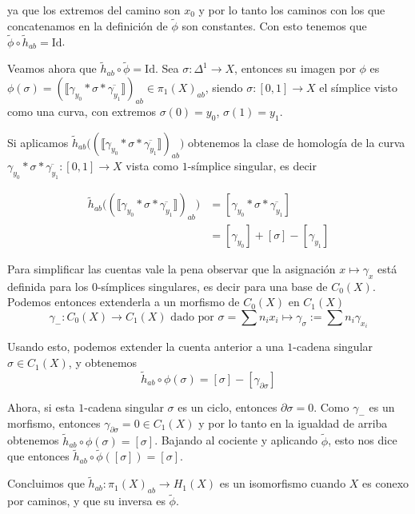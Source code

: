 ya que los extremos del camino son $x_0$ y por lo tanto los caminos con los que concatenamos en la definición de $\tilde{\phi}$ son constantes. Con esto tenemos que $\tilde{\phi}\circ\tilde{h}_{ab}= \text{Id}$.

Veamos ahora que $\tilde{h}_{ab}\circ\tilde{\phi}=\text{Id}$. Sea $\sigma:\Delta^1\to X$, entonces su imagen por $\phi$ es $\phi(\sigma)=\left(\llbracket\gamma_{y_0} *\sigma * \overline{\gamma_{y_1}}\rrbracket\right)_{ab}\in\pi_1(X)_{ab}$, siendo $\sigma:[0,1]\to X$ el símplice visto como una curva, con extremos $\sigma(0)=y_0$, $\sigma(1)=y_1$.

Si aplicamos $\tilde{h}_{ab}\big(\left(\llbracket\gamma_{y_0} *\sigma * \overline{\gamma_{y_1}}\rrbracket\right)_{ab}\big)$ obtenemos la clase de homología de la curva $\gamma_{y_0} *\sigma * \overline{\gamma_{y_1}}:[0,1]\to X$ vista como $1$-símplice singular, es decir

\begin{align*}
	\tilde{h}_{ab}\big(\left(\llbracket\gamma_{y_0} *\sigma * \overline{\gamma_{y_1}}\rrbracket\right)_{ab}\big)
	&=[\gamma_{y_0} *\sigma * \overline{\gamma_{y_1}}]\\
	&=[\gamma_{y_0}]+[\sigma]-[\gamma_{y_1}]
\end{align*}

Para simplificar las cuentas vale la pena observar que la asignación $x\mapsto \gamma_x$ está definida para los $0$-símplices singulares, es decir para una base de $C_0(X)$. Podemos entonces extenderla a un morfismo de $C_0(X)$ en $C_1(X)$ $$\gamma_{-}:C_0(X)\to C_1(X)\text{ dado por }\sigma=\sum n_i x_i\mapsto \gamma_\sigma := \sum n_i\gamma_{x_i}$$


Usando esto, podemos extender la cuenta anterior a una $1$-cadena singular $\sigma\in C_1(X)$, y obtenemos $$\tilde{h}_{ab}\circ\phi(\sigma) = [\sigma] - [\gamma_{\partial\sigma}]$$


Ahora, si esta $1$-cadena singular $\sigma$ es un ciclo, entonces $\partial\sigma=0$. Como $\gamma_{-}$ es un morfismo, entonces $\gamma_{\partial\sigma}=0\in C_1(X)$ y por lo tanto en la igualdad de arriba obtenemos $\tilde{h}_{ab}\circ\phi(\sigma) = [\sigma]$. Bajando al cociente y aplicando $\tilde{\phi}$, esto nos dice que entonces $\tilde{h}_{ab}\circ\tilde{\phi}([\sigma])=[\sigma]$.

Concluimos que $\tilde{h}_{ab}:\pi_1(X)_{ab}\to H_1(X)$ es un isomorfismo cuando $X$ es conexo por caminos, y que su inversa es $\tilde{\phi}$.


